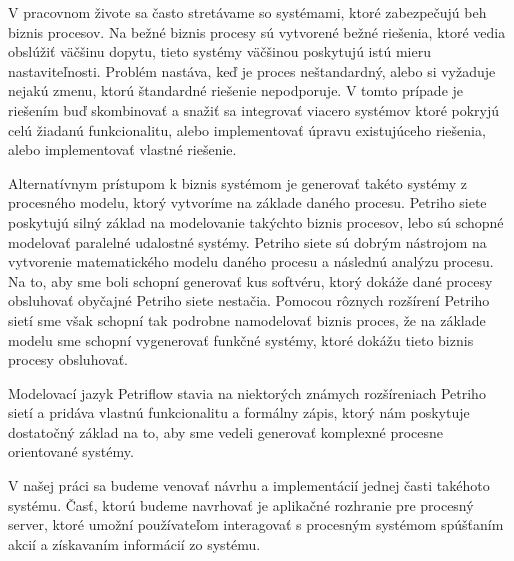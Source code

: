 V pracovnom živote sa často stretávame so systémami, ktoré zabezpečujú beh biznis procesov. Na bežné biznis procesy sú vytvorené bežné riešenia, ktoré vedia obslúžiť väčšinu dopytu, tieto systémy väčšinou poskytujú istú mieru nastaviteľnosti. Problém nastáva, keď je proces neštandardný, alebo si vyžaduje nejakú zmenu, ktorú štandardné riešenie nepodporuje. V tomto prípade je riešením buď skombinovať a snažiť sa integrovať viacero systémov ktoré pokryjú celú žiadanú funkcionalitu, alebo implementovať úpravu existujúceho riešenia, alebo implementovať vlastné riešenie. 

Alternatívnym prístupom k biznis systémom je generovať takéto systémy z procesného modelu, ktorý vytvoríme na základe daného procesu.
Petriho siete poskytujú silný základ na modelovanie takýchto biznis procesov, lebo sú schopné modelovať paralelné udalostné systémy.
Petriho siete sú dobrým nástrojom na vytvorenie matematického modelu daného procesu a následnú analýzu procesu. Na to, aby sme boli schopní generovať kus softvéru, ktorý dokáže dané procesy obsluhovať obyčajné Petriho siete nestačia.
Pomocou rôznych rozšírení Petriho sietí sme však schopní tak podrobne namodelovať biznis proces, že na základe modelu sme schopní vygenerovať funkčné systémy, ktoré dokážu tieto biznis procesy obsluhovať.  

Modelovací jazyk Petriflow stavia na niektorých známych rozšíreniach Petriho sietí a pridáva vlastnú funkcionalitu a formálny zápis, ktorý nám poskytuje dostatočný základ na to, aby sme vedeli generovať komplexné procesne orientované systémy. 

V našej práci sa budeme venovať návrhu a implementácií jednej časti takéhoto systému. Časť, ktorú budeme navrhovať je aplikačné rozhranie pre procesný server, ktoré umožní používateľom interagovať s procesným systémom spúšťaním akcií a získavaním informácií zo systému.

